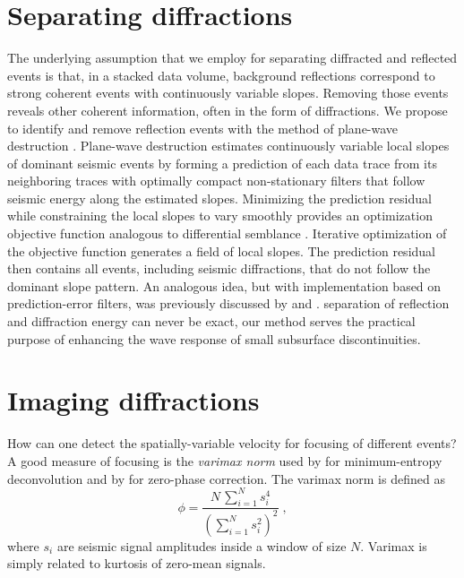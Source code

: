 \section{Separating diffractions}

The underlying assumption that we employ for separating diffracted and
reflected events is that, in a stacked data volume, background
reflections correspond to strong coherent events with continuously
variable slopes. Removing those events reveals other coherent
information, often in the form of  diffractions. We
propose to identify and remove reflection events with the method of
plane-wave destruction
\cite[]{pvi,GEO67-06-19461960}. Plane-wave destruction estimates 
continuously variable local slopes of dominant seismic events by
forming a prediction of each data trace from its neighboring traces
with optimally compact non-stationary filters that 
follow seismic energy along the estimated slopes. Minimizing the
prediction residual while constraining the local slopes to vary
smoothly provides an optimization objective function analogous to
differential semblance \cite[]{GEO56-05-06540663}. 
Iterative optimization of the objective function generates a field of
local slopes. The prediction residual then contains all events,
including seismic diffractions, that do not follow the dominant
slope pattern. An analogous
idea, but with implementation based on prediction-error filters, was
previously discussed by \cite{SEG-1994-1572} and
\cite{SEG-1996-0302}.  separation of reflection and
diffraction energy can never be exact,  our method
serves the practical purpose of enhancing the wave response of small
subsurface discontinuities.

\section{Imaging diffractions}

How can one detect the spatially-variable velocity  for
 focusing of different  events? A good measure of
focusing is the \emph{varimax norm} used by \cite{wiggins} for
minimum-entropy deconvolution and by \cite{GEO52-01-00510059} for
zero-phase correction. The varimax norm is defined as
\begin{equation}
  \label{eq:focus} \phi = \frac{\displaystyle N\,\sum_{i=1}^N
  s_i^4}{\displaystyle \left(\sum_{i=1}^{N} s_i^2\right)^2}\;,
\end{equation}
where $s_i$ are seismic signal amplitudes inside a window of
size $N$. Varimax is simply related to kurtosis of zero-mean signals.

